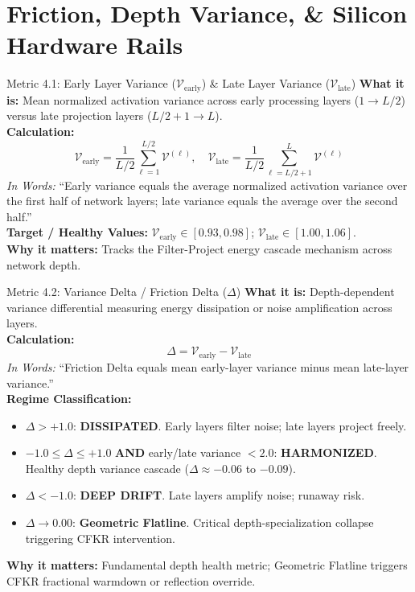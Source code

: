 \documentclass[11pt,a4paper]{article}
\begin{document}
\section{Friction, Depth Variance, \& Silicon Hardware Rails}

\begin{metricbox}{Metric 4.1: Early Layer Variance ($\mathcal{V}_{\text{early}}$) \& Late Layer Variance ($\mathcal{V}_{\text{late}}$)}
\textbf{What it is:} Mean normalized activation variance across early processing layers ($1 \to L/2$) versus late projection layers ($L/2+1 \to L$).\\
\textbf{Calculation:}
 $$\mathcal{V}_{\text{early}} = \frac{1}{L/2} \sum_{\ell=1}^{L/2} \mathcal{V}^{(\ell)}, \quad \mathcal{V}_{\text{late}} = \frac{1}{L/2} \sum_{\ell=L/2+1}^L \mathcal{V}^{(\ell)}$$ \emph{In Words:} ``Early variance equals the average normalized activation variance over the first half of network layers; late variance equals the average over the second half.''\\
\textbf{Target / Healthy Values:} $\mathcal{V}_{\text{early}} \in [0.93, 0.98]$; $\mathcal{V}_{\text{late}} \in [1.00, 1.06]$.\\
\textbf{Why it matters:} Tracks the Filter-Project energy cascade mechanism across network depth.
\end{metricbox}

\begin{metricbox}{Metric 4.2: Variance Delta / Friction Delta ($\Delta$)}
\textbf{What it is:} Depth-dependent variance differential measuring energy dissipation or noise amplification across layers.\\
\textbf{Calculation:}
 $$\Delta = \mathcal{V}_{\text{early}} - \mathcal{V}_{\text{late}}$$ \emph{In Words:} ``Friction Delta equals mean early-layer variance minus mean late-layer variance.''\\
\textbf{Regime Classification:}
\begin{itemize}
    \item $\Delta > +1.0$: \textbf{DISSIPATED}. Early layers filter noise; late layers project freely.
    \item $-1.0 \le \Delta \le +1.0$ \textbf{AND} early/late variance $< 2.0$: \textbf{HARMONIZED}. Healthy depth variance cascade ($\Delta \approx -0.06$ to $-0.09$).
    \item $\Delta < -1.0$: \textbf{DEEP DRIFT}. Late layers amplify noise; runaway risk.
    \item $\Delta \to 0.00$: \textbf{Geometric Flatline}. Critical depth-specialization collapse triggering CFKR intervention.
\end{itemize}
\textbf{Why it matters:} Fundamental depth health metric; Geometric Flatline triggers CFKR fractional warmdown or reflection override.
\end{metricbox}
\end{document}
